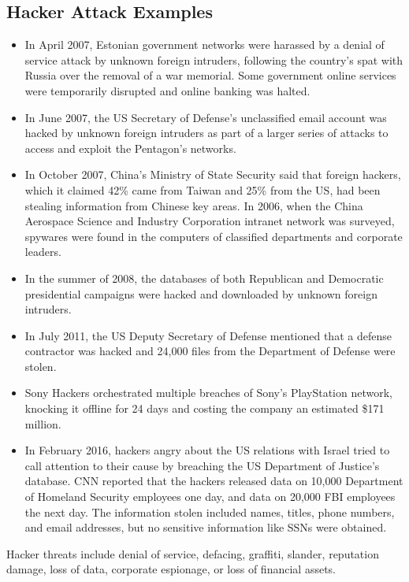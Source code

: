 \documentclass{math}
\begin{document}
\subsection*{Hacker Attack Examples}
\begin{itemize}
  \item In April 2007, Estonian government networks were harassed by a denial of
    service attack by unknown foreign intruders, following the country's spat
    with Russia over the removal of a war memorial. Some government online
    services were temporarily disrupted and online banking was halted.
  \item In June 2007, the US Secretary of Defense's unclassified email account
    was hacked by unknown foreign intruders as part of a larger series of
    attacks to access and exploit the Pentagon's networks.
  \item In October 2007, China's Ministry of State Security said that foreign
    hackers, which it claimed 42\% came from Taiwan and 25\% from the US, had
    been stealing information from Chinese key areas. In 2006, when the China
    Aerospace Science and Industry Corporation intranet network was surveyed,
    spywares were found in the computers of classified departments and
    corporate leaders.
  \item In the summer of 2008, the databases of both Republican and Democratic
    presidential campaigns were hacked and downloaded by unknown foreign
    intruders.
  \item In July 2011, the US Deputy Secretary of Defense mentioned that a
    defense contractor was hacked and 24,000 files from the Department of
    Defense were stolen.
  \item Sony Hackers orchestrated multiple breaches of Sony's PlayStation
    network, knocking it offline for 24 days and costing the company an
    estimated \$171 million.
  \item In February 2016, hackers angry about the US relations with Israel
    tried to call attention to their cause by breaching the US Department of
    Justice's database. CNN reported that the hackers released data on
    10,000 Department of Homeland Security employees one day, and data on
    20,000 FBI employees the next day. The information stolen included names,
    titles, phone numbers, and email addresses, but no sensitive information
    like SSNs were obtained.
\end{itemize}
Hacker threats include denial of service, defacing, graffiti, slander,
reputation damage, loss of data, corporate espionage, or loss of financial
assets.
\end{document}
